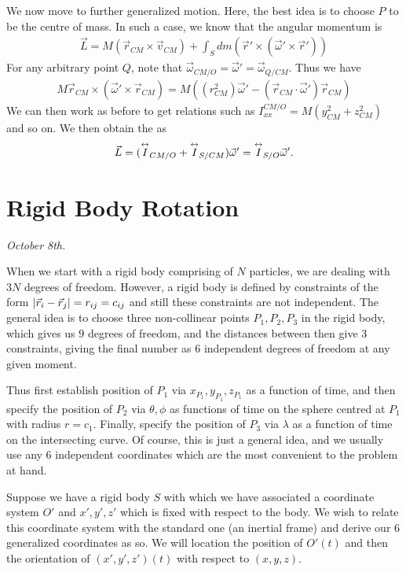 We now move to further generalized motion. Here, the best idea is to choose $P$ to be the centre of mass. In such a case, we know that the angular momentum is
\begin{align}
    \vec{L} = M(\vec{r}_{CM} \times \vec{v}_{CM}) + \int_{S} dm (\vec{r}' \times (\vec{\omega}' \times \vec{r}'))
\end{align}
For any arbitrary point $Q$, note that $\vec{\omega}_{CM/O} = \vec{\omega}' = \vec{\omega}_{Q/CM}$. Thus we have
\begin{align}
    M \vec{r}_{CM} \times (\vec{\omega}' \times \vec{r}_{CM}) = M\left( (r_{CM}^{2}) \vec{\omega}' - (\vec{r}_{CM} \cdot \vec{\omega}') \vec{r}_{CM} \right)
\end{align}
We can then work as before to get relations such as $I_{xx}^{CM/O} = M(y_{CM}^{2}+z_{CM}^{2})$ and so on. We then obtain the  as
\begin{align}
    \vec{L} = (\overset{\leftrightarrow}{I}_{CM/O} + \overset{\leftrightarrow}{I}_{S/CM}) \vec{\omega}' = \overset{\leftrightarrow}{I}_{S/O} \vec{\omega}'.
\end{align}

\section{Rigid Body Rotation}

\textit{October 8th.}

When we start with a rigid body comprising of $N$ particles, we are dealing with $3N$ degrees of freedom. However, a rigid body is defined by constraints of the form $\left| \vec{r}_{i}-\vec{r}_{j} \right| = r_{ij} = c_{ij}$ and still these constraints are not independent. The general idea is to choose three non-collinear points $P_{1},P_{2},P_{3}$ in the rigid body, which gives us $9$ degrees of freedom, and the distances between then give $3$ constraints, giving the final number as $6$ independent degrees of freedom at any given moment.

Thus first establish position of $P_{1}$ via $x_{P_{1}},y_{P_{1}},z_{P_{1}}$ as a function of time, and then specify the position of $P_{2}$ via $\theta,\phi$ as functions of time on the sphere centred at $P_{1}$ with radius $r = c_{1}$. Finally, specify the position of $P_{3}$ via $\lambda$ as a function of time on the intersecting curve. Of course, this is just a general idea, and we usually use any 6 independent coordinates which are the most convenient to the problem at hand.

Suppose we have a rigid body $S$ with which we have associated a coordinate system $O'$ and $x',y',z'$ which is fixed with respect to the body. We wish to relate this coordinate system with the standard one (an inertial frame) and derive our 6 generalized coordinates as so. We will location the position of $O'(t)$ and then the orientation of $(x',y',z')(t)$ with respect to $(x,y,z)$.


